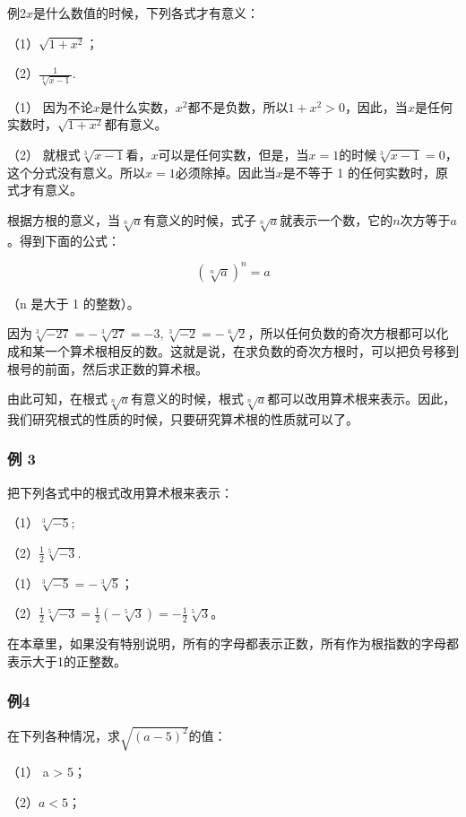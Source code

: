 例2\(x\)是什么数值的时候，下列各式才有意义：

（1）\(\sqrt{1 + x^2}\)；

（2）\(\frac{1}{\sqrt[3]{x - 1}}.\)

 （1）
因为不论\(x\)是什么实数，\(x^2\)都不是负数，所以\(1 + x^2 > 0\)，因此，当\(x\)是任何实数时，\(\sqrt{1 + x^2}\)都有意义。

（2）
就根式\(\sqrt[3]{x - 1}\)看，\(x\)可以是任何实数，但是，当\(x = 1\)的时候\(\sqrt[3]{x - 1} = 0\)，这个分式没有意义。所以\(x = 1\)必须除掉。因此当\(x\)是不等于
1 的任何实数时，原式才有意义。

根据方根的意义，当\(\sqrt[n]{a}\)有意义的时候，式子\(\sqrt[n]{a}\)就表示一个数，它的\(n\)次方等于\(a\)。得到下面的公式：

\[
(\sqrt[n]{a}) ^ {n} = a
\]

（n 是大于 1 的整数）。

因为\(\sqrt[3]{-27} = -\sqrt[3]{27} = -3, \sqrt[3]{-2} = -\sqrt[6]{2}\)，所以任何负数的奇次方根都可以化成和某一个算术根相反的数。这就是说，在求负数的奇次方根时，可以把负号移到根号的前面，然后求正数的算术根。

由此可知，在根式\(\sqrt[n]{a}\)有意义的时候，根式\(\sqrt[n]{a}\)都可以改用算术根来表示。因此，我们研究根式的性质的时候，只要研究算术根的性质就可以了。

\subsubsection{例 3}

把下列各式中的根式改用算术根来表示：

（1）\(\sqrt[3]{-5};\)

（2）\(\frac{1}{2}\sqrt[5]{-3}.\)

 （1）\(\sqrt[3]{-5} = -\sqrt[3]{5}\)；

（2）\(\frac{1}{2}\sqrt[5]{-3} = \frac{1}{2} (-\sqrt[5]{3}) = -\frac{1}{2}\sqrt[5]{3}\)。

在本章里，如果没有特别说明，所有的字母都表示正数，所有作为根指数的字母都表示大于1的正整数。

\subsubsection{例4}

在下列各种情况，求\(\sqrt{(a - 5)^2}\)的值：

（1） a \textgreater{} 5；

（2）\(a < 5\)；

